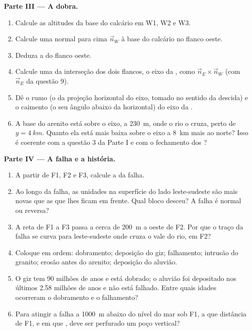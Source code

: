 \begin{problem}
\medskip
\noindent\textbf{Parte III --- A dobra.}
\begin{enumerate}[resume]
  \item Calcule as altitudes da base do calcário em W1, W2 e W3.
  \item Calcule uma normal para cima $\vec n_W$ à base do calcário no flanco oeste.
  \item Deduza a  do flanco oeste.
  \item Calcule uma  da interseção dos dois flancos, o eixo da , como $\vec n_E \times \vec n_W$ (com $\vec n_E$ da questão 9).
  \item Dê o rumo (o  da projeção horizontal do eixo, tomado no sentido da descida) e o caimento (o seu ângulo abaixo da horizontal) do eixo da .
  \item A base do arenito está sobre o eixo, a \qty{230}{m}, onde o rio o cruza, perto de $y = \qty{4}{km}$. Quanto ela está mais baixa sobre o eixo a \qty{8}{km} mais ao norte? Isso é coerente com a questão 3 da Parte I e com o fechamento dos ?
\end{enumerate}

\medskip
\noindent\textbf{Parte IV --- A falha e a história.}
\begin{enumerate}[resume]
  \item A partir de F1, F2 e F3, calcule a  da falha.
  \item Ao longo da falha, as unidades na superfície do lado leste-sudeste são mais novas que as que lhes ficam em frente. Qual bloco desceu? A falha é normal ou reversa?
  \item A reta de F1 a F3 passa a cerca de \qty{200}{m} a oeste de F2. Por que o traço da falha se curva para leste-sudeste onde cruza o vale do rio, em F2?
  \item Coloque em ordem: dobramento; deposição do giz; falhamento; intrusão do granito; erosão antes do arenito; deposição do aluvião.
  \item O giz tem 90 milhões de anos e está dobrado; o aluvião foi depositado nos últimos 2.58 milhões de anos e não está falhado. Entre quais idades ocorreram o dobramento e o falhamento?
  \item Para atingir a falha a \qty{1000}{m} abaixo do nível do mar sob F1, a que distância de F1, e em que , deve ser perfurado um poço vertical?
\end{enumerate}
\end{problem}
